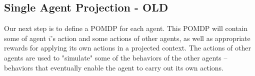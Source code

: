 \documentclass[letterpaper]{article} %
\theoremstyle{definition}
\begin{document}
\subsection{Single Agent Projection - OLD}
Our next step is to define a POMDP for each agent. This POMDP will contain some of agent $i$'s action and some actions of other agents,
as well as appropriate rewards for applying its own actions in a
projected context. 
The actions of other agents are used to "simulate" some of the behaviors of the other agents -- behaviors that eventually enable the agent to carry out its own actions.
\end{document}
